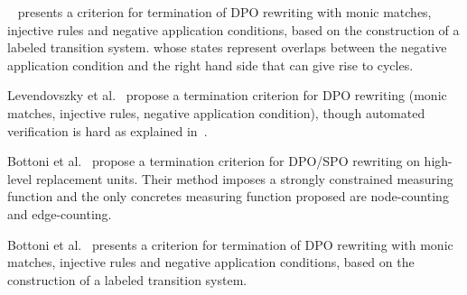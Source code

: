 ~\cite{bottoni2010atermination} presents a criterion for termination of DPO rewriting with monic matches, injective rules and negative application conditions, based on the construction of a labeled transition system.
whose states represent overlaps between the negative application condition and the right hand side that can give rise to cycles.

Levendovszky et al.~\cite{levendovszky2007termination} propose a termination criterion for DPO rewriting (monic matches, injective rules, negative application condition), though automated verification is hard as explained in~\cite[]{levendovszky2007termination}. 

Bottoni et al.~\cite{bottoni2005termination} propose a termination criterion for DPO/SPO rewriting on high-level replacement units. Their method imposes a strongly constrained measuring function and the only concretes measuring function proposed are node-counting and edge-counting.

Bottoni et al.~\cite{bottoni2010atermination} presents a criterion for termination of DPO rewriting with monic matches, injective rules and negative application conditions, based on the construction of a labeled transition system. 

